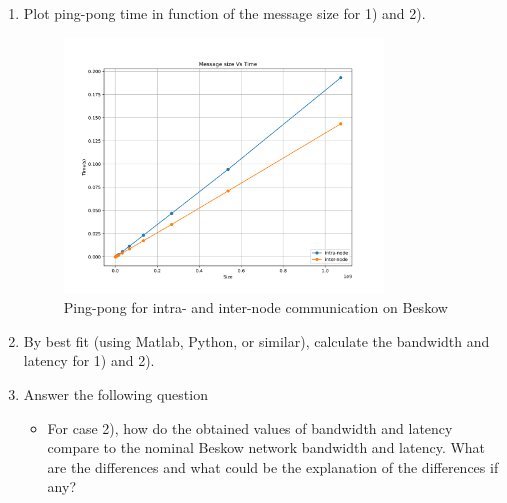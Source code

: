 \documentclass[12pt]{article}
\begin{document}
\begin{enumerate}
\begin{itemize}
    \end{itemize}

    \item Plot ping-pong time in function of the message size for 1) and 2).

    \begin{figure}[H]
    \centering
    \includegraphics[width=0.8\textwidth]{graph-ping-pong.png}
    \caption{Ping-pong for intra- and inter-node communication on Beskow}
    \label{fig:blocking}
  \end{figure}

    \item By best fit (using Matlab, Python, or similar), calculate the bandwidth and latency for 1) and 2).
    \item Answer the following question
    \begin{itemize}
        \item For case 2), how do the obtained values of bandwidth and latency compare to the nominal Beskow network bandwidth and latency. What are the differences and what could be the explanation of the differences if any?
    \end{itemize}
\end{enumerate}
\end{document}
